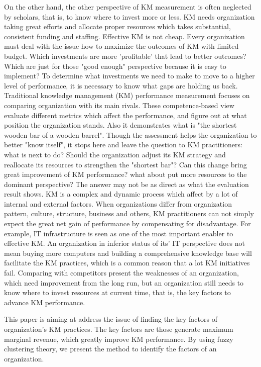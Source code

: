 \documentclass{elsarticle}
\begin{document}
 On the other hand, the other
 perspective of KM measurement is often neglected by scholars, that
 is, to know where to invest more or less.  KM needs organization
 taking great efforts and allocate proper resources which  takes substantial, consistent funding and staffing. Effective KM is
 not cheap. Every organization must deal with the issue how to
 maximize the outcomes of KM with limited budget.  Which 
 investments are more 'profitable' that lead to better outcomes?
 Which are just for those "good enough" perspective  because  it is
 easy to implement? To determine what investments we need to make to
 move to a higher level of performance, it is necessary to know what
 gaps are holding us back. Traditional knowledge management (KM)
 performance measurement focuses on comparing
 organization with its main rivals. These competence-based view
 evaluate different metrics which affect the performance, and figure
 out at what position the organization stands. Also it demonstrates
 what is "the shortest wooden bar of a wooden barrel". Though the
 assessment helps the organization to better "know itself", it stops
 here and leave the question to KM  practitioners: what is next to do?
 Should the organization adjust its KM strategy and reallocate its
 resources to strengthen the "shortest bar"? Can this change bring
 great improvement of KM performance? what about put more resources to
 the dominant perspective? The answer may not be as direct as what the
 evaluation result shows. KM is a complex and dynamic process which
 affect by a lot of internal and external factors. When organizations
 differ from organization pattern, culture, structure, business and
 others, KM practitioners can not simply expect the great net gain of
 performance  by compensating for disadvantage. For example, IT
 infrastructure is seen as one of the most important enabler to
 effective KM. An organization in inferior status of its' IT
 perspective does not mean buying more computers and building a
 comprehensive knowledge base will facilitate the KM practices, which
 is a common reason that a lot KM initiatives fail. Comparing with
 competitors present the weaknesses of an organization, which need
 improvement from the long run, but an organization still needs to
 know where to invest resources at current time, that is, the key
 factors to advance KM performance.

This paper is aiming at address the issue of finding the key factors
of organization's KM practices. The key factors are those generate
maximum marginal revenue, which greatly improve KM performance. By
using fuzzy clustering theory, we present the method to identify the
factors of an organization.              
\end{document}
